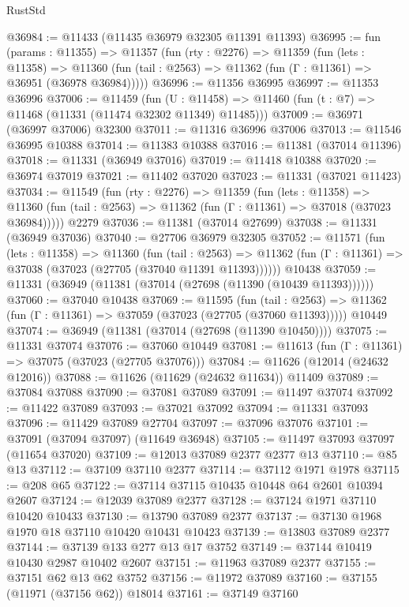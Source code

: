 \begin{lexlean}{RustStd}
\begin{coremodule}
@36984 := @11433 (@11435 @36979 @32305 @11391 @11393)
@36995 := fun (params : @11355) =>
  @11357
    (fun (rty : @2276) =>
    @11359
      (fun (lets : @11358) =>
      @11360 (fun (tail : @2563) => @11362 (fun (Γ : @11361) => @36951 (@36978 @36984)))))
@36996 := @11356 @36995
@36997 := @11353 @36996
@37006 := @11459
    (fun (U : @11458) => @11460 (fun (t : @7) => @11468 (@11331 (@11474 @32302 @11349) @11485)))
@37009 := @36971 (@36997 @37006) @32300
@37011 := @11316 @36996 @37006
@37013 := @11546 @36995 @10388
@37014 := @11383 @10388
@37016 := @11381 (@37014 @11396)
@37018 := @11331 (@36949 @37016)
@37019 := @11418 @10388
@37020 := @36974 @37019
@37021 := @11402 @37020
@37023 := @11331 (@37021 @11423)
@37034 := @11549
    (fun (rty : @2276) =>
    @11359
      (fun (lets : @11358) =>
      @11360 (fun (tail : @2563) => @11362 (fun (Γ : @11361) => @37018 (@37023 @36984)))))
    @2279
@37036 := @11381 (@37014 @27699)
@37038 := @11331 (@36949 @37036)
@37040 := @27706 @36979 @32305
@37052 := @11571
    (fun (lets : @11358) =>
    @11360
      (fun (tail : @2563) =>
      @11362 (fun (Γ : @11361) => @37038 (@37023 (@27705 (@37040 @11391 @11393))))))
    @10438
@37059 := @11331 (@36949 (@11381 (@37014 (@27698 (@11390 (@10439 @11393))))))
@37060 := @37040 @10438
@37069 := @11595
    (fun (tail : @2563) => @11362 (fun (Γ : @11361) => @37059 (@37023 (@27705 (@37060 @11393)))))
    @10449
@37074 := @36949 (@11381 (@37014 (@27698 (@11390 @10450))))
@37075 := @11331 @37074
@37076 := @37060 @10449
@37081 := @11613 (fun (Γ : @11361) => @37075 (@37023 (@27705 @37076)))
@37084 := @11626 (@12014 (@24632 @12016))
@37088 := @11626 (@11629 (@24632 @11634)) @11409
@37089 := @37084 @37088
@37090 := @37081 @37089
@37091 := @11497 @37074
@37092 := @11422 @37089
@37093 := @37021 @37092
@37094 := @11331 @37093
@37096 := @11429 @37089 @27704
@37097 := @37096 @37076
@37101 := @37091 (@37094 @37097) (@11649 @36948)
@37105 := @11497 @37093 @37097 (@11654 @37020)
@37109 := @12013 @37089 @2377 @2377 @13
@37110 := @85 @13
@37112 := @37109 @37110 @2377
@37114 := @37112 @1971 @1978
@37115 := @208 @65
@37122 := @37114 @37115 @10435 @10448 @64 @2601 @10394 @2607
@37124 := @12039 @37089 @2377
@37128 := @37124 @1971 @37110 @10420 @10433
@37130 := @13790 @37089 @2377
@37137 := @37130 @1968 @1970 @18 @37110 @10420 @10431 @10423
@37139 := @13803 @37089 @2377
@37144 := @37139 @133 @277 @13 @17 @3752
@37149 := @37144 @10419 @10430 @2987 @10402 @2607
@37151 := @11963 @37089 @2377
@37155 := @37151 @62 @13 @62 @3752
@37156 := @11972 @37089
@37160 := @37155 (@11971 (@37156 @62)) @18014
@37161 := @37149 @37160

\end{coremodule}
\end{lexlean}
